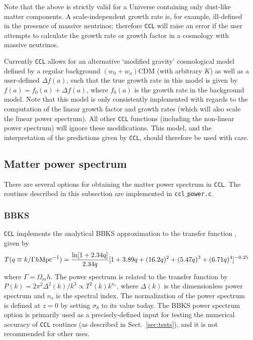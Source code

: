 \documentclass[\docopts]{\docclass}
\newcommand{\ccl}{{\tt CCL}\xspace}
\begin{document}
Note that the above is strictly valid for a Universe containing only dust-like matter components. A scale-independent growth rate is, for example, ill-defined in the presence of massive neutrinos; therefore \ccl will raise an error if the user attempts to calculate the growth rate or growth factor in a cosmology with massive neutrinos.

Currently \ccl allows for an alternative `modified gravity' cosmological model defined by a regular background $(w_0+w_a)$CDM (with arbitrary $K$) as well as a user-defined $\Delta f(a)$, such that the true growth rate in this model is given by $f(a)=f_0(a)+\Delta f(a)$, where $f_0(a)$ is the growth rate in the background model. Note that this model is only consistently implemented with regards to the computation of the linear growth factor and growth rates (which will also scale the linear power spectrum). All other \ccl functions (including the non-linear power spectrum) will ignore these modifications. This model, and the interpretation of the predictions given by \ccl, should therefore be used with care.

\subsection{Matter power spectrum}
\label{sec:power}

There are several options for obtaining the matter power spectrum in \ccl.
The routines described in this subsection are implemented in {\tt ccl$\_$power.c}.

\subsubsection{BBKS}
\ccl implements the analytical BBKS approximation to the transfer function \citep{BBKS}, given by
\begin{equation}
T(q\equiv k/\Gamma h {\rm Mpc}^{-1}) = \frac{\ln[1+2.34q]}{2.34q}[1+3.89q+(16.2q)^2+(5.47q)^3+(6.71q)^4]^{-0.25}
\end{equation}
where $\Gamma = \Omega_m h$.
The power spectrum is related to the transfer function by 
$P(k) = 2 \pi^2 \Delta^2(k) /k^3  \propto T^2(k) k^{n_s}$, where $\Delta(k)$ is the dimensionless power 
spectrum and $n_s$ is the spectral index. The normalization of the power spectrum is defined at $z=0$ by 
setting $\sigma_8$ to its value today.
The BBKS power spectrum option is primarily used as a precisely-defined input for testing the numerical accuracy of \ccl routines (as described in Sect.~\ref{sec:tests}), and it is not recommended for other uses.
\end{document}
